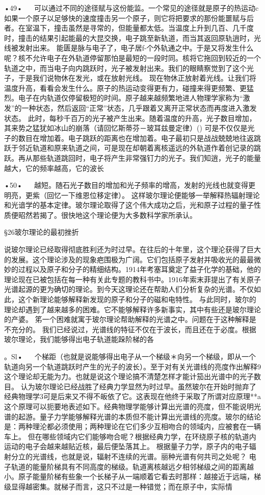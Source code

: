 •49•
  
可以通过不同的途径赋与这份能监。一个常见的途径就是原子的热运动c如果一个原子以足够快的速度撞击另一个原子，则它将把要求的那份能噩赋与后者。在室温下，撞击虽然是寻常的，但能量都太低。当温度上升到几百、几千度时，撞击的结果引起能最的大昆交换，电子跳至新轨道，而当其返回原轨逍时，光线被发射出来。
能匮是脉与电子了，电子居f-个外轨通之中。于是又将发生什么呢？核不允许电子在外轨道停留那怕是最短的一段时同。核将它拖回到较近的一个轨道之中，而当电子向内跳跃时，光子被发射出来。我们的眼睛察觉到了这个光子，于是我们说物休在发光，或在放射光线。
现在物休正放射着光线。让我们将温度升高，看看会发生什么。原子的热运动变得更有力，碰撞来得更频繁、更猛烈。电子在内轨道仅停留极短的时间。原子越来越频繁地进人物理学家称为“激发”的一种状态，然后返回“正常”状态，几乎跟着又离开正常状态而再度进入激发状态。
此时，每秒千百万的光子被产生出来。随着温度的升高，光子数目增加，其来势之猛犹如冰山的崩落（请回忆斯蒂芬－玻耳兹曼定律）()
可是不仅仅是光子的数目在增加着。电子跳跃的距离也在增加着。电子最初只是战战兢兢地往返跳跃于邻近轨道和原来轨道之间，可是现在却朝着离核遥远的外轨道作着创记录的跳跃。再从那些轨道跳回时，电子将产生非常强钉力的光子。我们知逍，光子的能量越大，它的频率越高，它的波长

•50•
  
越短。随石光子数目的增加和光子频率的增高，发射的光线也就变得更明亮，更紫（回忆一下维恩位移定律）。
这样玻尔理论便能够一举解释热辐射理论和光谙学的基本定律。玻尔理论取得了这个伟大成功之后，光和原子过程的量子性质便昭然若揭了。很快地这个理论便为大多数科学家所承认。

§26玻尔理论的最初挫折

说玻尔理论已经取得彻底胜利还为时过早。在往后的十年里，这个理沦获得了巨大的发展。这个理论涉及的现象疤围极为广阔。它们包括原子发射并吸收光的最最微妙的过程以及原子和分子的精细结构。1914年考塞耳奠定了益子化学的基础，他的理论现在已被包括在每一种有关此专题的教科书中。1916年索末菲提出了有关原子光谱起源的更为确切的理论。到今天这理论还在帮助人们分析复杂的光谱。不仅如此，这个新理论能够解释新发现的原子和分子的磁和电特性。
与此同时，玻尔的理论却遇到了越来越多的困难。它不能够解释许多新事实，其中有些还是玻尔理论的产婆。
笫一个困难就寓于玻尔理论帮助解释的光谱之中。问题在于这种解释是不充分的。
我们已经说过，光谱线的特征不仅在于波长，而且还在于必度。根据玻尔理论，我们能够得出电子轨道能跺阶梯的各

。Sl•
  
个梯距（也就是说能够得出电子从一个梯级＊向另一个梯级，即从一个轨道向另一个轨道跳跃时产生的光子的波长）。至于对有关光谱线的亮度作出解释9这个理论却无能为力。也就是说这个理论搞不清楚怎样才能计笳出光谱中的光子数目。
认为玻尔理论已经战胜了经典力学显然为时过早。虽然玻尔在开始时抛弃了经典物理学3可是后来又不得不皈依了它。这表现在他终于采取了所谓对应原理**a
这个原理可以扼要地表述如下。经典物理学能够计算出光谱的亮度，但不能说明光谱的起游。量子力学能够解释光谱的本质但不能计算出光谱线的亮度。玻尔的结论是：两种理沦都必须使用；两种理论在它们多少互相吻合的领域内，应被套在一辆车上。
但在哪些领域内它们能够吻合呢？根据经典力学，在环绕原子核的轨道内运动的电子会越来越贴近核，最后便坠落其上。
根据量子力学，原子内的电子辐射分立的光谱线，也就是说，辐射不连续的光谱。丽种光谱有何共司之处呢？
电子轨道的能量阶梯具有不同高度的梯级。轨道离核越远夕相邻梯级之间的距离越小。原子能量阶梯有些象一个长梯子从一端顺着它看去时那样：越接近于远端，梯级显得越密集。就梯子而言，这只不过是一种错觉；而在原子中，实际情


